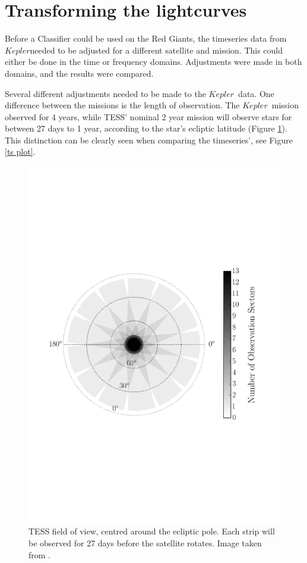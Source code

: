 \documentclass[a4paper,fleqn,usenatbib,useAMS]{mnras}
\newcommand{\kep}{\ensuremath{Kepler}\:}
\begin{document}
\section{Transforming the lightcurves}
\label{sect: dataset}

Before a Classifier could be used on the Red Giants, the timeseries data from \kep needed to be adjusted for a different satellite and mission. This could either be done in the time or frequency domains. Adjustments were made in both domains, and the results were compared. %

Several different adjustments needed to be made to the \kep \ data. One difference between the missions is the length of observation. The \kep \ mission observed for 4 years, while TESS' nominal 2 year mission will observe stars for between 27 days to 1 year, according to the star's ecliptic latitude (Figure \ref{TESS field}). This distinction can be clearly seen when comparing the timeseries', see Figure \ref{ts plot}.

\begin{figure}
	\centering
	\includegraphics[scale=0.4]{cropped_TESSfield.pdf}
	\caption{TESS field of view, centred around the ecliptic pole. Each strip will be observed for 27 days before the satellite rotates. Image taken from \citet{campante_asteroseismic_2016}.}	
	\label{TESS field}
\end{figure} 
\end{document}
